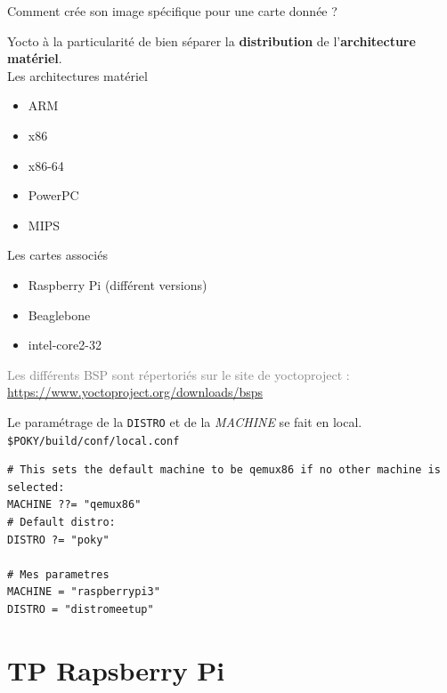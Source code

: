 \documentclass[compress]{smilebeamer}
\begin{document}
\begin{frame}
\begin{center}
\textcolor{smileOrange}{\huge{Comment crée son image spécifique pour une carte donnée ?}}
\end{center}
\end{frame}

\begin{frame}
Yocto à la particularité de bien séparer la \textbf{distribution} de l'\textbf{architecture matériel}.
\newline \\
Les architectures matériel
\begin{itemize}
	\item ARM
	\item x86
	\item x86-64
	\item PowerPC
	\item MIPS
\end{itemize}
Les cartes associés
\begin{itemize}
	\item Raspberry Pi (différent versions)
	\item Beaglebone
	\item intel-core2-32
\end{itemize}
\textcolor{gray}{\tiny{Les différents BSP sont répertoriés sur le site de yoctoproject : \url{https://www.yoctoproject.org/downloads/bsps}}}
\end{frame}

\begin{frame}[fragile]
Le paramétrage de la \texttt{DISTRO} et de la \textsl{MACHINE} se fait en local.
\newline \\
\texttt{\$POKY/build/conf/local.conf}
\begin{lstlisting}[style=bitbake]
# This sets the default machine to be qemux86 if no other machine is selected:
MACHINE ??= "qemux86"
# Default distro:
DISTRO ?= "poky"

# Mes parametres
MACHINE = "raspberrypi3"
DISTRO = "distromeetup"
\end{lstlisting}
\end{frame}


\section{TP Rapsberry Pi}
\end{document}
